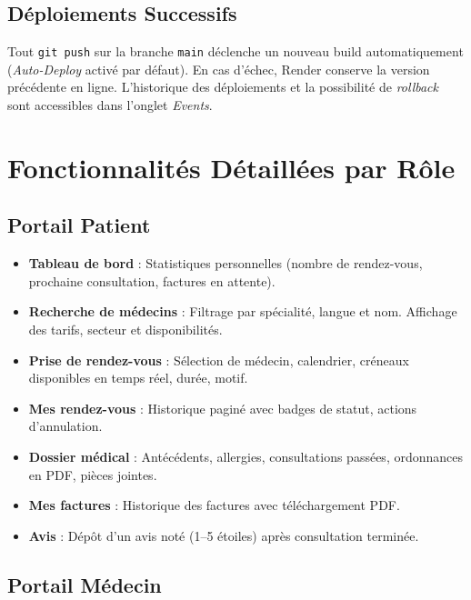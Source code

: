 \documentclass[12pt,a4paper]{report}
\begin{document}
\section{Déploiements Successifs}

Tout \texttt{git push} sur la branche \texttt{main} déclenche un nouveau build automatiquement (\textit{Auto-Deploy} activé par défaut). En cas d'échec, Render conserve la version précédente en ligne. L'historique des déploiements et la possibilité de \textit{rollback} sont accessibles dans l'onglet \textit{Events}.

\chapter{Fonctionnalités Détaillées par Rôle}

\section{Portail Patient}

\begin{itemize}[leftmargin=*,itemsep=3pt]
  \item \textbf{Tableau de bord} : Statistiques personnelles (nombre de rendez-vous, prochaine consultation, factures en attente).
  \item \textbf{Recherche de médecins} : Filtrage par spécialité, langue et nom. Affichage des tarifs, secteur et disponibilités.
  \item \textbf{Prise de rendez-vous} : Sélection de médecin, calendrier, créneaux disponibles en temps réel, durée, motif.
  \item \textbf{Mes rendez-vous} : Historique paginé avec badges de statut, actions d'annulation.
  \item \textbf{Dossier médical} : Antécédents, allergies, consultations passées, ordonnances en PDF, pièces jointes.
  \item \textbf{Mes factures} : Historique des factures avec téléchargement PDF.
  \item \textbf{Avis} : Dépôt d'un avis noté (1–5 étoiles) après consultation terminée.
\end{itemize}

\section{Portail Médecin}
\end{document}
